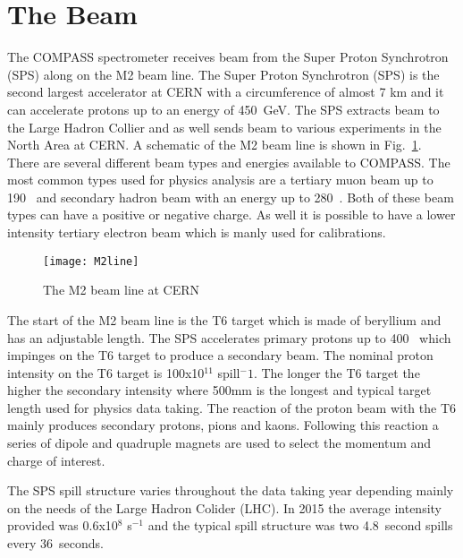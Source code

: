 \section{The Beam}
The COMPASS spectrometer receives beam from the Super Proton Synchrotron (SPS)
along on the M2 beam line.  The Super Proton Synchrotron (SPS) is the second
largest accelerator at CERN with a circumference of almost 7 km and it can
accelerate protons up to an energy of 450~GeV.  The SPS extracts beam to the
Large Hadron Collier and as well sends beam to various experiments in the North
Area at CERN.  A schematic of the M2 beam line is shown in
Fig.~\ref{fig::M2line}.  There are several different beam types and energies
available to COMPASS.  The most common types used for physics analysis are a
tertiary muon beam up to 190~{\gvc} and secondary hadron beam with an energy up
to 280~{\gvc}.  Both of these beam types can have a positive or negative charge.
As well it is possible to have a lower intensity tertiary electron beam which is
manly used for calibrations. \par

\begin{figure}[h!t]
  \centering
  \texttt{[image: M2line]}
  \caption{The M2 beam line at CERN}
  \label{fig::M2line}
\end{figure}

The start of the M2 beam line is the T6 target which is made of beryllium and
has an adjustable length.  The SPS accelerates primary protons up to 400~{\gvc}
which impinges on the T6 target to produce a secondary beam.  The nominal proton
intensity on the T6 target is 100x10$^{11}$ spill$^-1$.  The longer the T6
target the higher the secondary intensity where 500mm is the longest and typical
target length used for physics data taking.  The reaction of the proton beam
with the T6 mainly produces secondary protons, pions and kaons.  Following this
reaction a series of dipole and quadruple magnets are used to select the
momentum and charge of interest. \par

The SPS spill structure varies throughout the data taking year depending mainly
on the needs of the Large Hadron Colider (LHC).  In 2015 the average intensity
provided was 0.6x10$^8$ s$^{-1}$ and the typical spill structure was two
4.8~second spills every 36~seconds.

